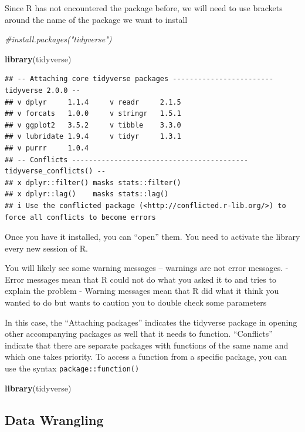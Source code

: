 \documentclass[
]{book}
\newenvironment{Shaded}{\begin{snugshade}}{\end{snugshade}}
\newcommand{\CommentTok}[1]{\textcolor[rgb]{0.56,0.35,0.01}{\textit{#1}}}
\newcommand{\FunctionTok}[1]{\textcolor[rgb]{0.13,0.29,0.53}{\textbf{#1}}}
\newcommand{\NormalTok}[1]{#1}
\begin{document}
Since R has not encountered the package before, we will need to use brackets around the name of the package we want to install

\begin{Shaded}
\begin{Highlighting}[]
\CommentTok{\#install.packages("tidyverse")}

\FunctionTok{library}\NormalTok{(tidyverse)}
\end{Highlighting}
\end{Shaded}

\begin{verbatim}
## -- Attaching core tidyverse packages ------------------------ tidyverse 2.0.0 --
## v dplyr     1.1.4     v readr     2.1.5
## v forcats   1.0.0     v stringr   1.5.1
## v ggplot2   3.5.2     v tibble    3.3.0
## v lubridate 1.9.4     v tidyr     1.3.1
## v purrr     1.0.4     
## -- Conflicts ------------------------------------------ tidyverse_conflicts() --
## x dplyr::filter() masks stats::filter()
## x dplyr::lag()    masks stats::lag()
## i Use the conflicted package (<http://conflicted.r-lib.org/>) to force all conflicts to become errors
\end{verbatim}

Once you have it installed, you can ``open'' them. You need to activate the library every new session of R.

You will likely see some warning messages -- warnings are not error messages.
- Error messages mean that R could not do what you asked it to and tries to explain the problem
- Warning messages mean that R did what it think you wanted to do but wants to caution you to double check some parameters

In this case, the ``Attaching packages'' indicates the tidyverse package in opening other accompanying packages as well that it needs to function. ``Conflicts'' indicate that there are separate packages with functions of the same name and which one takes priority. To access a function from a specific package, you can use the syntax \texttt{package::function()}

\begin{Shaded}
\begin{Highlighting}[]
\FunctionTok{library}\NormalTok{(tidyverse)}
\end{Highlighting}
\end{Shaded}

\subsection{Data Wrangling}\label{data-wrangling}
\end{document}
